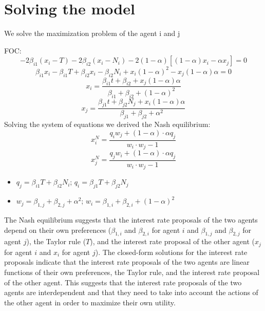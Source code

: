 \documentclass[12pt]{article}
\begin{document}
\section{Solving the model}
We solve the maximization problem of the agent i and j\par
FOC:
\[ -2\beta_{i1}(x_i-T)-2\beta_{i2}(x_i-N_i)-2(1 - \alpha) [(1 - \alpha) x_i - \alpha x_j]=0 \]
\[ \beta_{i1}x_i-\beta_{i1}T+\beta_{i2}x_i-\beta_{i2}N_i+ x_i (1 - \alpha)^2 - x_j (1 - \alpha)\alpha = 0 \]
\[ x_i = \frac{\beta_{i1} t + \beta_{i2} + x_j (1 - \alpha)\alpha}{\beta_{i1} + \beta_{i2} + (1 - \alpha)^2}\]
\[ x_j = \frac{\beta_{j1}t+\beta_{j2}N_j+ x_i (1 - \alpha)\alpha}{\beta_{j1}+\beta_{j2}+\alpha^2}\]
Solving the system of equations we derived the Nash equilibrium:
\[x_i^N = \frac{ q_i w_j + (1 - \alpha)\cdot\alpha q_j} {w_i \cdot w_j - 1}\]
\[x_j^N = \frac{ q_j w_i + (1 - \alpha)\cdot\alpha q_j} {w_i \cdot w_j - 1}\]
\begin{itemize}
    \item \(q_j = \beta_{i1} T + \beta_{i2} N_i\); \(q_i = \beta_{j1} T + \beta_{j2} N_j\)
    \item \(w_j = \beta_{1,j} + \beta_{2,j} + \alpha^2\); \(w_i = \beta_{1,i} + \beta_{2,i} + (1 - \alpha)^2\)
\end{itemize}

The Nash equilibrium suggests that the interest rate proposals of the two agents depend on their own preferences
($\beta_{1,i}$ and $\beta_{2,i}$ for agent $i$ and $\beta_{1,j}$ and $\beta_{2,j}$ for agent $j$), the Taylor rule
($T$), and the interest rate proposal of the other agent ($x_j$ for agent $i$ and $x_i$ for agent $j$).
\vspace{8pt}
The closed-form solutions for the interest rate proposals indicate that the interest rate proposals of the two agents
are linear functions of their own preferences, the Taylor rule, and the interest rate proposal of the other agent. This
suggests that the interest rate proposals of the two agents are interdependent and that they need to take into account
the actions of the other agent in order to maximize their own utility.
\end{document}
